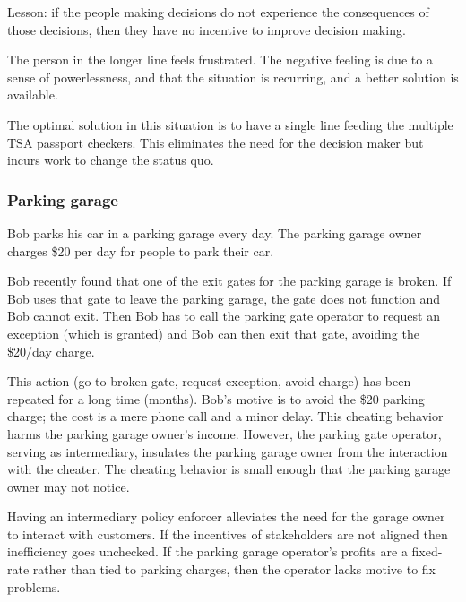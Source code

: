 Lesson: if the people making decisions do not experience the consequences of those decisions, then they have no incentive to improve decision making.

The person in the longer line feels frustrated. The negative feeling is due to a sense of powerlessness, and that the situation is recurring, and a better solution is available.

The optimal solution in this situation is to have a single line feeding the multiple TSA passport checkers. This eliminates the need for the decision maker but incurs work to change the status quo.


\subsubsection{Parking garage}

\begin{mdframed}
Bob parks his car in a parking garage every day. 
The parking garage owner charges \$20 per day for people to park their car.

Bob recently found that one of the exit gates for the parking garage is broken. If Bob uses that gate to leave the parking garage, the gate does not function and Bob cannot exit. Then Bob has to call the parking gate operator to request an exception (which is granted) and Bob can then exit that gate, avoiding the \$20/day charge.

This action (go to broken gate, request exception, avoid charge) has been repeated for a long time (months). Bob's motive is to avoid the \$20 parking charge; the cost is a mere phone call and a minor delay. This cheating behavior harms the parking garage owner's income. However, the parking gate operator, serving as intermediary, insulates the parking garage owner from the interaction with the cheater. The cheating behavior is small enough that the parking garage owner may not notice.
\end{mdframed}

Having an intermediary policy enforcer alleviates the need for the garage owner to interact with customers. If the incentives of stakeholders are not aligned then inefficiency goes unchecked. If the parking garage operator's profits are a fixed-rate rather than tied to parking charges, then the operator lacks motive to fix problems. 